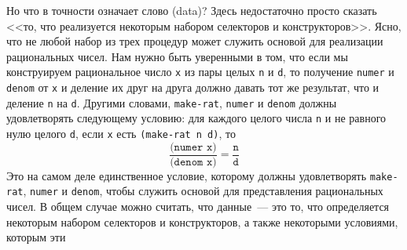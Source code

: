 Но что в точности означает слово  (data)?  Здесь недостаточно просто сказать
<<то, что реализуется некоторым набором селекторов и конструкторов>>.
Ясно, что не любой набор из трех процедур может служить основой для
реализации рациональных чисел.  Нам нужно быть уверенными в том, что
если мы конструируем рациональное число {\tt x} из пары целых
{\tt n} и {\tt d}, то получение {\tt numer} и
{\tt denom} от {\tt x} и деление их друг на друга должно 
давать тот же результат, что и деление {\tt n} на
{\tt d}.  Другими словами, {\tt make-rat},
{\tt numer} и {\tt denom} должны удовлетворять следующему условию:
для каждого целого числа {\tt n} и не равного нулю целого
{\tt d}, если {\tt x} есть {\tt (make-rat n d)},
то
$$
\frac{\texttt{(numer x)}}{\texttt{(denom x)}} 
        = \frac{\texttt{n}}{\texttt{d}}
$$
%
%
%
Это на самом деле единственное условие, которому должны удовлетворять
{\tt make-rat}, {\tt numer} и {\tt denom}, чтобы
служить основой для представления рациональных чисел.  В общем случае
можно считать, что данные~--- это то, что определяется некоторым набором
селекторов и конструкторов, а также некоторыми условиями, которым эти
